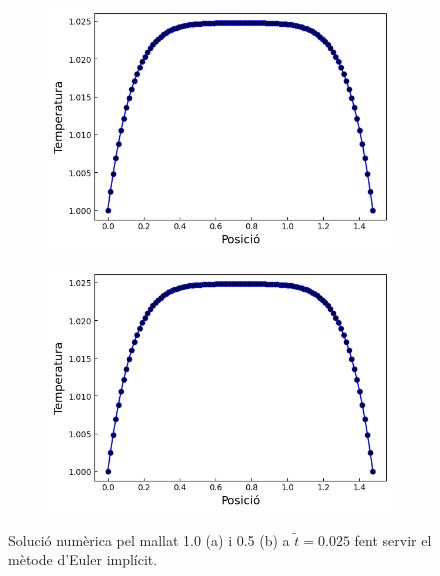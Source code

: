 \documentclass{article}
\begin{document}
\begin{figure}[h]
    \centering
    \begin{subfigure}[b]{0.35\textwidth}
        \includegraphics[width=\textwidth]{images/T_vs_z_imp_at1.png} 
        \caption{}
        \label{fig:euler_imp_at1}
    \end{subfigure}
    \hspace{1.5cm}
    \begin{subfigure}[b]{0.35\textwidth}
        \includegraphics[width=\textwidth]{images/T_vs_z_imp_at2.png}
        \caption{} 
        \label{fig:euler_imp_at2}
    \end{subfigure}
    \caption{Solució numèrica pel mallat 1.0 (a) i 0.5 (b) a $\tilde{t}=0.025$ fent servir el mètode d'Euler implícit.}
    \label{fig:euler_implicit}
\end{figure}
\end{document}
